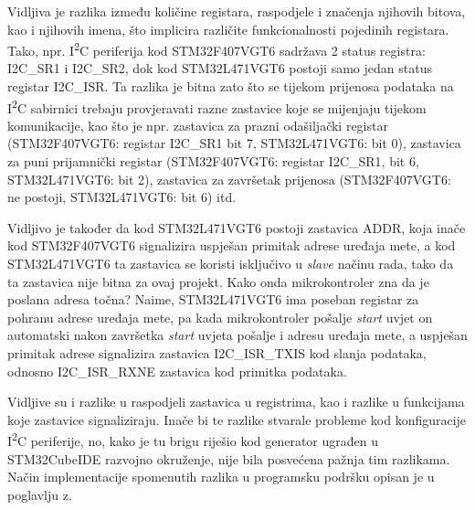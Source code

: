 Vidljiva je razlika između količine registara, raspodjele i značenja njihovih bitova, kao i njihovih imena, što implicira različite funkcionalnosti pojedinih registara. Tako, npr. I\textsuperscript{2}C periferija kod STM32F407VGT6 sadržava 2 status registra: I2C\_SR1 i I2C\_SR2, dok kod STM32L471VGT6 postoji samo jedan status registar I2C\_ISR. Ta razlika je bitna zato što se tijekom prijenosa podataka na I\textsuperscript{2}C sabirnici trebaju provjeravati razne zastavice koje se mijenjaju tijekom komunikacije, kao što je npr. zastavica za prazni odašiljački registar (STM32F407VGT6: registar I2C\_SR1 bit 7, STM32L471VGT6: bit 0), zastavica za puni prijamnički registar (STM32F407VGT6: registar I2C\_SR1, bit 6, STM32L471VGT6: bit 2), zastavica za završetak prijenosa (STM32F407VGT6: ne postoji, STM32L471VGT6: bit 6) itd.

Vidljivo je također da kod STM32L471VGT6 postoji zastavica ADDR, koja inače kod STM32F407VGT6 signalizira uspješan primitak adrese uređaja mete, a kod \newline STM32L471VGT6 ta zastavica se koristi isključivo u \textit{slave} načinu rada, tako da ta zastavica nije bitna za ovaj projekt. Kako onda mikrokontroler zna da je poslana adresa točna? Naime, STM32L471VGT6 ima poseban registar za pohranu adrese uređaja mete, pa kada mikrokontroler pošalje \textit{start} uvjet on automatski nakon završetka \textit{start} uvjeta pošalje i adresu uređaja mete, a uspješan primitak adrese signalizira zastavica I2C\_ISR\_TXIS kod slanja podataka, odnosno I2C\_ISR\_RXNE zastavica kod primitka podataka.

Vidljive su i razlike u raspodjeli zastavica u registrima, kao i razlike u funkcijama koje zastavice signaliziraju. Inače bi te razlike stvarale probleme kod konfiguracije I\textsuperscript{2}C periferije, no, kako je tu brigu riješio kod generator ugrađen u STM32CubeIDE razvojno okruženje, nije bila posvećena pažnja tim razlikama. Način implementacije spomenutih razlika u programsku podršku opisan je u poglavlju z.